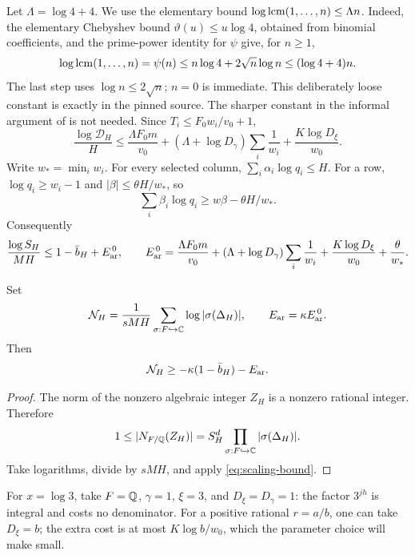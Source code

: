 Let \(\Lambda=\log4+4\). We use the elementary bound
\(\log\operatorname{lcm}(1,\ldots,n)\le\Lambda n\).
Indeed, the elementary Chebyshev bound
\(\vartheta(u)\le u\log4\), obtained from binomial coefficients,
and the prime-power identity for \(\psi\) give, for \(n\ge1\),
\[
 \log\operatorname{lcm}(1,\ldots,n)=\psi(n)
 \le n\log4+2\sqrt n\log n
 \le(\log4+4)n.
\]
The last step uses \(\log n\le2\sqrt n\); \(n=0\) is immediate.
This deliberately loose constant is exactly
 in the pinned source.
The sharper constant in the informal argument of
\cite[Section 3.1]{OAIpi} is not needed.
Since \(T_i\le F_0w_i/v_0+1\),
\begin{equation}\label{eq:log-D}
 \frac{\log\mathcal D_H}{H}
 \le \frac{\Lambda F_0m}{v_0}
    +(\Lambda+\log D_\gamma)\sum_i\frac1{w_i}
    +\frac{K\log D_\xi}{w_0}.
\end{equation}
Write \(w_*=\min_iw_i\). For every selected column,
\(\sum_i\alpha_i\log q_i\le H\).
For a row, \(\log q_i\ge w_i-1\) and
\(|\beta|\le\theta H/w_*\), so
\[
 \sum_i\beta_i\log q_i\ge w\beta-\theta H/w_*.
\]
Consequently
\begin{equation}\label{eq:scaling-bound}
 \frac{\log S_H}{MH}\le1-\bar b_H+E_{\rm ar}^{\,0},
 \qquad
 E_{\rm ar}^{\,0}=
 \frac{\Lambda F_0m}{v_0}
 +(\Lambda+\log D_\gamma)\sum_i\frac1{w_i}
 +\frac{K\log D_\xi}{w_0}+\frac{\theta}{w_*}.
\end{equation}

\begin{proposition}\label{prop:arithmetic}
Set
\[
 \mathcal N_H=\frac1{sMH}
        \sum_{\sigma:F\hookrightarrow\mathbb C}\log|\sigma(\Delta_H)|,
 \qquad E_{\rm ar}=\kappa E_{\rm ar}^{\,0}.
\]
Then
\begin{equation}\label{eq:arithmetic}
 \mathcal N_H\ge-\kappa(1-\bar b_H)-E_{\rm ar}.
\end{equation}
\end{proposition}
\begin{proof}
The norm of the nonzero algebraic integer \(Z_H\) is a nonzero
rational integer. Therefore
\[
 1\le|N_{F/\mathbb Q}(Z_H)|
   =S_H^d\prod_{\sigma:F\hookrightarrow\mathbb C}|\sigma(\Delta_H)|.
\]
Take logarithms, divide by \(sMH\), and apply
\eqref{eq:scaling-bound}.
\end{proof}

For \(x=\log3\), take \(F=\mathbb Q\), \(\gamma=1\), \(\xi=3\),
and \(D_\xi=D_\gamma=1\): the factor \(3^{jh}\) is integral
and costs no denominator. For a positive rational \(r=a/b\),
one can take \(D_\xi=b\); the extra cost is at most
\(K\log b/w_0\), which the parameter choice will make small.
